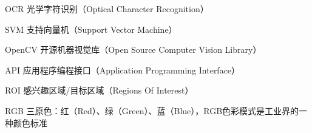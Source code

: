 ﻿\begin{denotation}
  \item[OCR] 光学字符识别（Optical Character Recognition）
  \item[SVM] 支持向量机（Support Vector Machine）
  \item[OpenCV] 开源机器视觉库（Open Source Computer Vision Library）
  \item[API] 应用程序编程接口（Application Programming Interface）
  \item[ROI] 感兴趣区域/目标区域（Regions Of Interest）
  \item[RGB] 三原色：红（Red）、绿（Green）、蓝（Blue），RGB色彩模式是工业界的一种颜色标准
\end{denotation}
